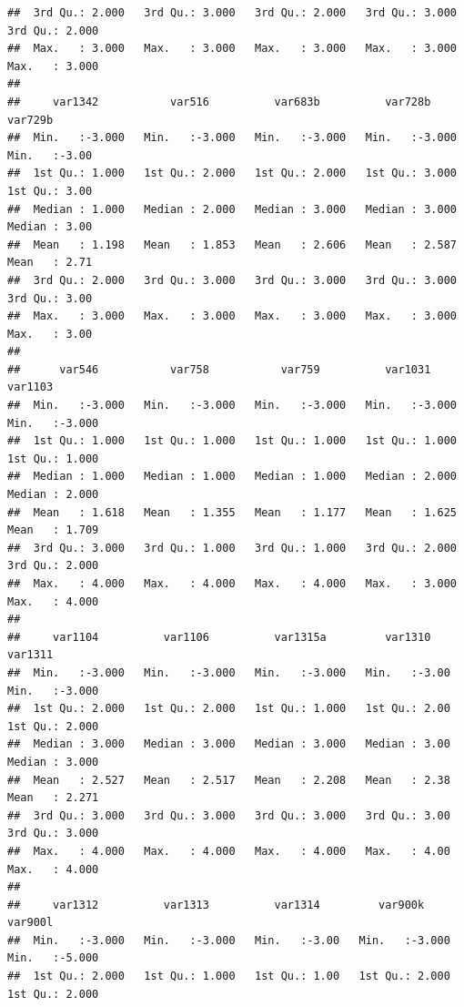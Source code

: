 \documentclass[
]{book}
\begin{document}
\begin{verbatim}
##  3rd Qu.: 2.000   3rd Qu.: 3.000   3rd Qu.: 2.000   3rd Qu.: 3.000   3rd Qu.: 2.000  
##  Max.   : 3.000   Max.   : 3.000   Max.   : 3.000   Max.   : 3.000   Max.   : 3.000  
##                                                                                      
##     var1342           var516          var683b          var728b          var729b     
##  Min.   :-3.000   Min.   :-3.000   Min.   :-3.000   Min.   :-3.000   Min.   :-3.00  
##  1st Qu.: 1.000   1st Qu.: 2.000   1st Qu.: 2.000   1st Qu.: 3.000   1st Qu.: 3.00  
##  Median : 1.000   Median : 2.000   Median : 3.000   Median : 3.000   Median : 3.00  
##  Mean   : 1.198   Mean   : 1.853   Mean   : 2.606   Mean   : 2.587   Mean   : 2.71  
##  3rd Qu.: 2.000   3rd Qu.: 3.000   3rd Qu.: 3.000   3rd Qu.: 3.000   3rd Qu.: 3.00  
##  Max.   : 3.000   Max.   : 3.000   Max.   : 3.000   Max.   : 3.000   Max.   : 3.00  
##                                                                                     
##      var546           var758           var759          var1031          var1103      
##  Min.   :-3.000   Min.   :-3.000   Min.   :-3.000   Min.   :-3.000   Min.   :-3.000  
##  1st Qu.: 1.000   1st Qu.: 1.000   1st Qu.: 1.000   1st Qu.: 1.000   1st Qu.: 1.000  
##  Median : 1.000   Median : 1.000   Median : 1.000   Median : 2.000   Median : 2.000  
##  Mean   : 1.618   Mean   : 1.355   Mean   : 1.177   Mean   : 1.625   Mean   : 1.709  
##  3rd Qu.: 3.000   3rd Qu.: 1.000   3rd Qu.: 1.000   3rd Qu.: 2.000   3rd Qu.: 2.000  
##  Max.   : 4.000   Max.   : 4.000   Max.   : 4.000   Max.   : 3.000   Max.   : 4.000  
##                                                                                      
##     var1104          var1106          var1315a         var1310         var1311      
##  Min.   :-3.000   Min.   :-3.000   Min.   :-3.000   Min.   :-3.00   Min.   :-3.000  
##  1st Qu.: 2.000   1st Qu.: 2.000   1st Qu.: 1.000   1st Qu.: 2.00   1st Qu.: 2.000  
##  Median : 3.000   Median : 3.000   Median : 3.000   Median : 3.00   Median : 3.000  
##  Mean   : 2.527   Mean   : 2.517   Mean   : 2.208   Mean   : 2.38   Mean   : 2.271  
##  3rd Qu.: 3.000   3rd Qu.: 3.000   3rd Qu.: 3.000   3rd Qu.: 3.00   3rd Qu.: 3.000  
##  Max.   : 4.000   Max.   : 4.000   Max.   : 4.000   Max.   : 4.00   Max.   : 4.000  
##                                                                                     
##     var1312          var1313          var1314         var900k          var900l      
##  Min.   :-3.000   Min.   :-3.000   Min.   :-3.00   Min.   :-3.000   Min.   :-5.000  
##  1st Qu.: 2.000   1st Qu.: 1.000   1st Qu.: 1.00   1st Qu.: 2.000   1st Qu.: 2.000  

\end{verbatim}
\end{document}

